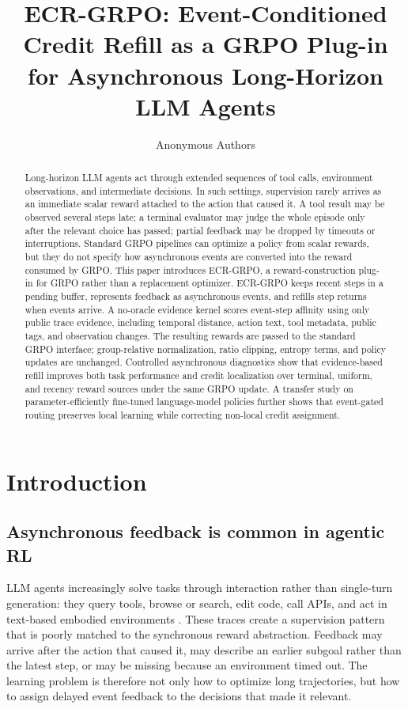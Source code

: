 \documentclass[letterpaper]{article} %
\title{ECR-GRPO: Event-Conditioned Credit Refill as a GRPO Plug-in for Asynchronous Long-Horizon LLM Agents}
\author{Anonymous Authors}
\begin{document}
\maketitle

\begin{abstract}
Long-horizon LLM agents act through extended sequences of tool calls, environment observations, and intermediate decisions. In such settings, supervision rarely arrives as an immediate scalar reward attached to the action that caused it. A tool result may be observed several steps late; a terminal evaluator may judge the whole episode only after the relevant choice has passed; partial feedback may be dropped by timeouts or interruptions. Standard GRPO pipelines can optimize a policy from scalar rewards, but they do not specify how asynchronous events are converted into the reward consumed by GRPO. This paper introduces ECR-GRPO, a reward-construction plug-in for GRPO rather than a replacement optimizer. ECR-GRPO keeps recent steps in a pending buffer, represents feedback as asynchronous events, and refills step returns when events arrive. A no-oracle evidence kernel scores event-step affinity using only public trace evidence, including temporal distance, action text, tool metadata, public tags, and observation changes. The resulting rewards are passed to the standard GRPO interface; group-relative normalization, ratio clipping, entropy terms, and policy updates are unchanged. Controlled asynchronous diagnostics show that evidence-based refill improves both task performance and credit localization over terminal, uniform, and recency reward sources under the same GRPO update. A transfer study on parameter-efficiently fine-tuned language-model policies further shows that event-gated routing preserves local learning while correcting non-local credit assignment.

\end{abstract}

\section{Introduction}

\subsection{Asynchronous feedback is common in agentic RL}

LLM agents increasingly solve tasks through interaction rather than single-turn generation: they query tools, browse or search, edit code, call APIs, and act in text-based embodied environments \citep{yao2022react,yao2022webshop,shridhar2020alfworld}. These traces create a supervision pattern that is poorly matched to the synchronous reward abstraction. Feedback may arrive after the action that caused it, may describe an earlier subgoal rather than the latest step, or may be missing because an environment timed out. The learning problem is therefore not only how to optimize long trajectories, but how to assign delayed event feedback to the decisions that made it relevant.
\end{document}
